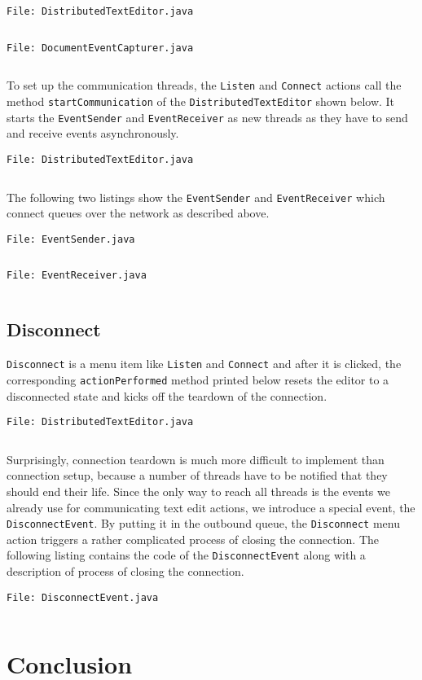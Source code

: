 \documentclass[a4paper,draft,12pt,oneside,article,table]{memoir}
\newcommand{\srcpath}{../ex09/src/main/java/ddist}
\newcommand{\inmnt}[3]{\vspace{1em}\noindent\texttt{\color{gray}File: #3}\vspace{-1em}\inputminted[tabsize=4,firstline=#1,firstnumber=#1,lastline=#2,linenos]{java}{\srcpath/#3}}
\newcommand{\mil}[1]{\texttt{#1}}
\begin{document}
\inmnt{43}{67}{DistributedTextEditor.java}

\inmnt{30}{39}{DocumentEventCapturer.java}

To set up the communication threads, the \mil{Listen} and \mil{Connect} actions
call the method \mil{startCommunication} of the
\mil{DistributedTextEditor} shown below. It starts the \mil{EventSender}
and \mil{EventReceiver} as new threads as they have to send and receive
events asynchronously.

\inmnt{300}{318}{DistributedTextEditor.java}

The following two listings show the \mil{EventSender} and
\mil{EventReceiver} which connect queues over the network as described
above.

\inmnt{1}{1000}{EventSender.java}

\inmnt{1}{1000}{EventReceiver.java}

\section{Disconnect}

\mil{Disconnect} is a menu item like \mil{Listen} and \mil{Connect} and
after it is clicked, the corresponding \mil{actionPerformed} method
printed below resets the editor to a disconnected state and kicks off
the teardown of the connection.

\inmnt{230}{240}{DistributedTextEditor.java}

Surprisingly, connection teardown is much more difficult to implement
than connection setup, because a number of threads have to be notified
that they should end their life. Since the only way to reach all threads
is the events we already use for communicating text edit actions, we
introduce a special event, the \mil{DisconnectEvent}. By putting it in
the outbound queue, the \mil{Disconnect} menu action triggers a rather
complicated process of closing the connection. The following listing
contains the code of the \mil{DisconnectEvent} along with a description
of process of closing the connection.

\inmnt{1}{1000}{DisconnectEvent.java}


\chapter{Conclusion}

\end{document}
